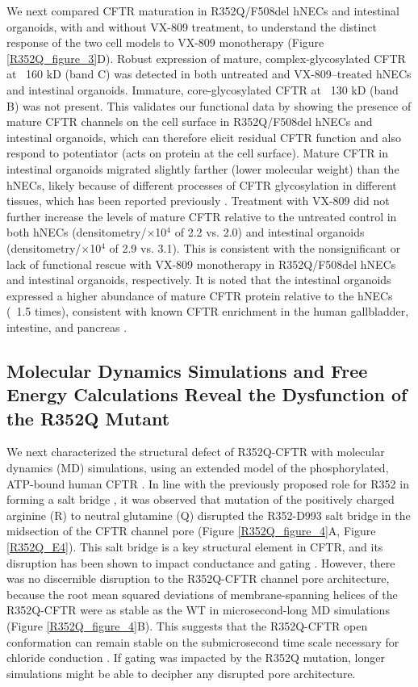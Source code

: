 We next compared CFTR maturation in R352Q/F508del hNECs and intestinal organoids, with and without VX-809 treatment, to understand the distinct response of the two cell models to VX-809 monotherapy (Figure \ref{R352Q_figure_3}D). Robust expression of mature, complex-glycosylated CFTR at ~160 kD (band C) was detected in both untreated and VX-809–treated hNECs and intestinal organoids. Immature, core-glycosylated CFTR at ~130 kD (band B) was not present. This validates our functional data by showing the presence of mature CFTR channels on the cell surface in R352Q/F508del hNECs and intestinal organoids, which can therefore elicit residual CFTR function and also respond to potentiator (acts on protein at the cell surface). Mature CFTR in intestinal organoids migrated slightly farther (lower molecular weight) than the hNECs, likely because of different processes of CFTR glycosylation in different tissues, which has been reported previously \cite{vanbarneveld2010}. Treatment with VX-809 did not further increase the levels of mature CFTR relative to the untreated control in both hNECs (densitometry/×10$^4$ of 2.2 vs. 2.0) and intestinal organoids (densitometry/×10$^4$ of 2.9 vs. 3.1). This is consistent with the nonsignificant or lack of functional rescue with VX-809 monotherapy in R352Q/F508del hNECs and intestinal organoids, respectively. It is noted that the intestinal organoids expressed a higher abundance of mature CFTR protein relative to the hNECs (~1.5 times), consistent with known CFTR enrichment in the human gallbladder, intestine, and pancreas \cite{human_protein_atlas_2021, uhlen2015}.

\subsection{Molecular Dynamics Simulations and Free Energy Calculations Reveal the Dysfunction of the R352Q Mutant}

We next characterized the structural defect of R352Q-CFTR with molecular dynamics (MD) simulations, using an extended model of the phosphorylated, ATP-bound human CFTR \cite{wong2022}. In line with the previously proposed role for R352 in forming a salt bridge \cite{cui2008}, it was observed that mutation of the positively charged arginine (R) to neutral glutamine (Q) disrupted the R352-D993 salt bridge in the midsection of the CFTR channel pore (Figure \ref{R352Q_figure_4}A, Figure \ref{R352Q_E4}). This salt bridge is a key structural element in CFTR, and its disruption has been shown to impact conductance and gating \cite{cui2008}. However, there was no discernible disruption to the R352Q-CFTR channel pore architecture, because the root mean squared deviations of membrane-spanning helices of the R352Q-CFTR were as stable as the WT in microsecond-long MD simulations (Figure \ref{R352Q_figure_4}B). This suggests that the R352Q-CFTR open conformation can remain stable on the submicrosecond time scale necessary for chloride conduction \cite{sorum2015}. If gating was impacted by the R352Q mutation, longer simulations might be able to decipher any disrupted pore architecture.

